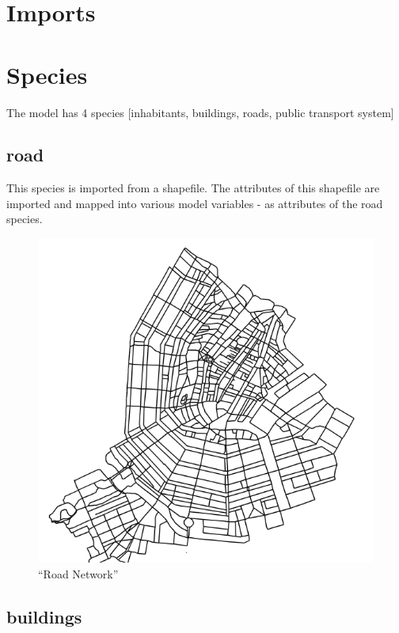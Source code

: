 \documentclass[]{book}
\theoremstyle{definition}
\theoremstyle{definition}
\theoremstyle{definition}
\theoremstyle{remark}
\begin{document}
\hypertarget{imports}{%
\chapter{Imports}\label{imports}}

\hypertarget{species}{%
\chapter{Species}\label{species}}

The model has 4 species {[}inhabitants, buildings, roads, public
transport system{]}

\hypertarget{road}{%
\section{road}\label{road}}

This species is imported from a shapefile. The attributes of this
shapefile are imported and mapped into various model variables - as
attributes of the road species.

\begin{figure}
\centering
\includegraphics{images/network.png}
\caption{``Road Network''}
\end{figure}

\hypertarget{buildings}{%
\section{buildings}\label{buildings}}
\end{document}

